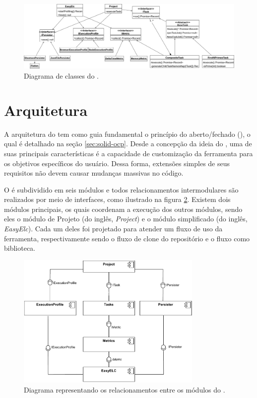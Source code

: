 \documentclass[12pt]{tcc}
\begin{document}
	\begin{figure}[!ht]
		\centering
		\includegraphics[width=\textwidth]{figures/diagrama-classes.png}
		\caption[Diagrama de Classes]{Diagrama de classes do .}
		\label{fig:diag-classes}
	\end{figure}


	\section{Arquitetura}
	\label{sec:arquitetura}

	A arquitetura do  tem como guia fundamental o princípio do aberto/fechado (), o qual é detalhado na seção \ref{sec:solid-ocp}.
	Desde a concepção da ideia do , uma de suas principais características é a capacidade de customização da ferramenta para os objetivos específicos do usuário.
	Dessa forma, extensões simples de seus requisitos não devem causar mudanças massivas no código.

	O  é subdividido em seis módulos e todos relacionamentos intermodulares são realizados por meio de interfaces, como ilustrado na figura \ref{fig:diagrama-arquitetura}.
	Existem dois módulos principais, os quais coordenam a execução dos outros módulos, sendo eles o módulo de Projeto (do inglês, \emph{Project}) e o módulo  simplificado (do inglês, \emph{EasyElc}).
	Cada um deles foi projetado para atender um fluxo de uso da ferramenta, respectivamente sendo o fluxo de clone do repositório e o fluxo como biblioteca.

	\begin{figure}[!ht]
		\centering
		\includegraphics[width=0.8\textwidth]{figures/diagramaarquiteturaelchupacabra.pdf}
		\caption[Diagrama de Módulos]{Diagrama representando os relacionamentos entre os módulos do .}
		\label{fig:diagrama-arquitetura}
	\end{figure}
	
\end{document}

